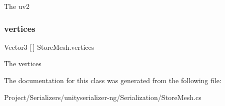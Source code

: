 The uv2 

\mbox{\label{class_store_mesh_a189a0d91c5aae63a798faee218866ff4}} 
\subsubsection{\texorpdfstring{vertices}{vertices}}
{\footnotesize\ttfamily Vector3 \mbox{[}$\,$\mbox{]} Store\+Mesh.\+vertices}



The vertices 



The documentation for this class was generated from the following file\+:\begin{DoxyCompactItemize}
\item 
Project/\+Serializers/unityserializer-\/ng/\+Serialization/Store\+Mesh.\+cs\end{DoxyCompactItemize}
